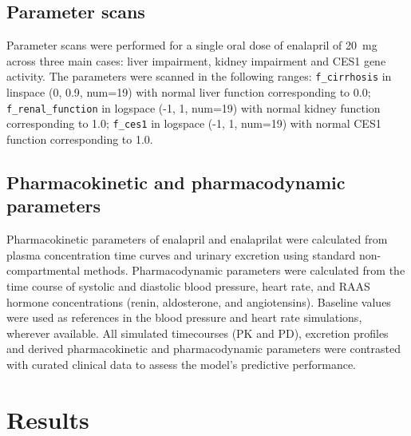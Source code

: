 \documentclass[pharmaceutics,article,submit,pdftex,moreauthors]{Definitions/mdpi}
\begin{document}
\subsection{Parameter scans}
\label{sec:methods_scans}
Parameter scans were performed for a single oral dose of enalapril of 20~mg across three main cases: liver impairment, kidney impairment and CES1 gene activity. The parameters were scanned in the following ranges: \texttt{f\_cirrhosis} in linspace (0, 0.9, num=19) with normal liver function corresponding to 0.0; \texttt{f\_renal\_function} in logspace (-1, 1, num=19) with normal kidney function corresponding to 1.0; \texttt{f\_ces1} in logspace (-1, 1, num=19) with normal CES1 function corresponding to 1.0. 

\subsection{Pharmacokinetic and pharmacodynamic parameters}
\label{sec:methods_pkpd_parameters}
Pharmacokinetic parameters of enalapril and enalaprilat were calculated from plasma concentration time curves and urinary excretion using standard non-compartmental methods. Pharmacodynamic parameters were calculated from the time course of systolic and diastolic blood pressure, heart rate, and RAAS hormone concentrations (renin, aldosterone, and angiotensins). Baseline values were used as references in the blood pressure and heart rate simulations, wherever available. All simulated timecourses (PK and PD), excretion profiles and derived pharmacokinetic and pharmacodynamic parameters were contrasted with curated clinical data to assess the model's predictive performance. 

\section{Results}
\end{document}
